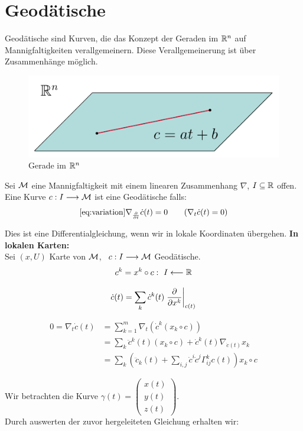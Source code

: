 \chapter{Geodätische}
Geodätische sind Kurven, die das Konzept der Geraden im $\mathbb{R}^n$ auf Mannigfaltigkeiten verallgemeinern.
Diese Verallgemeinerung ist über Zusammenhänge möglich.
\begin{figure}[H]
\centering
\includegraphics[width=0.6\linewidth]{figures/tikz/linern.pdf}
\caption{Gerade im $\mathbb{R}^n$}
\label{img:linern}
\end{figure} 
\begin{defs}[Geodätische]
Sei $\mathcal{M}$ eine Mannigfaltigkeit mit einem linearen Zusammenhang $\nabla$, $I \subseteq \mathbb{R}$ offen. Eine Kurve $c: I \longrightarrow \mathcal{M}$ ist eine Geodätische falls:
\begin{align*} 
\ref{eq:variation}
\nabla_{\frac{\partial}{\partial t}} \dot{c}(t) = 0 \qquad (\nabla_t \dot{c}(t) = 0)
\end{align*}
\end{defs}
Dies ist eine Differentialgleichung, wenn wir in lokale Koordinaten übergehen.
\textbf{In lokalen Karten:} \\
Sei $(x,U)$ Karte von $\mathcal{M}$, \ $c: I \longrightarrow \mathcal{M}$ Geodätische. 
\begin{align}
c^k = x^k \circ c: \ I \longleftarrow \mathbb{R}
\end{align}

\begin{align}
\dot{c}(t) = \sum_k \dot{c}^k(t) \eval{\frac{\partial}{\partial x^k}}_{c(t)}
\end{align}

\begin{align*}
0=\nabla_t\dot{c}(t) &= \sum_{k=1}^{m}\nabla_t(\dot{c}^k(x_k\circ c)) \\
							   &= \sum_k \ddot{c}^k(t)(x_k\circ c) + \dot{c}^k(t)\nabla_{\dot{c}(t)}x_k \\
							   &= \sum_k \left(\ddot{c}_k(t) + \sum_{i,j}\dot{c}^{i}\dot{c}^j \Gamma_{ij}^k c(t)\right) x_k \circ c
\end{align*}

Wir betrachten die Kurve $\gamma(t)= \begin{pmatrix}
x(t) \\ y(t) \\z(t) \end{pmatrix}$. \\

Durch auswerten der zuvor hergeleiteten Gleichung erhalten wir:



